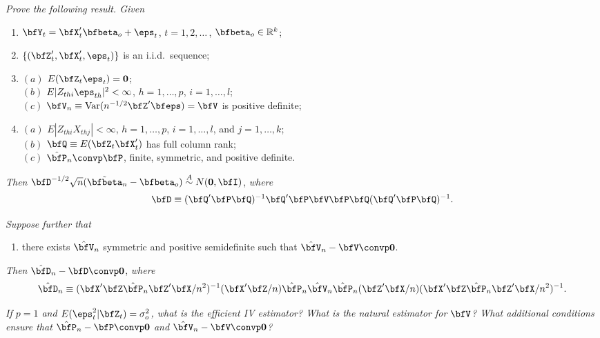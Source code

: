 \begin{exercises}

\item\label{ex:iv-iid-clt} \textit{Prove the following result. Given}
\begin{enumerate}
\item[$(i)$] $\bfY_t = \bfX_t'\bfbeta_o + \eps_t$, \quad $t = 1, 2, \ldots$\,, $\bfbeta_o \in \mathbb{R}^k$;
\item[$(ii)$] $\{(\bfZ_t', \bfX_t', \eps_t)\}$ is an i.i.d.\ sequence;
\item[$(iii)$] $(a)$ $E(\bfZ_t \eps_t) = \mathbf{0}$;\\
$(b)$ $E|Z_{thi}\eps_{th}|^2 < \infty$, $h = 1, \ldots, p$, $i = 1, \ldots, l$;\\
$(c)$ $\bfV_n \equiv \Var(n^{-1/2}\bfZ'\bfeps) = \bfV$ is positive definite;
\item[$(iv)$] $(a)$ $E|Z_{thi}X_{thj}| < \infty$, $h = 1, \ldots, p$, $i = 1, \ldots, l$, and $j = 1, \ldots, k$;\\
$(b)$ $\bfQ \equiv E(\bfZ_t \bfX_t')$ has full column rank;\\
$(c)$ $\hat{\bfP}_n \convp \bfP$, finite, symmetric, and positive definite.
\end{enumerate}

\textit{Then} $\bfD^{-1/2}\sqrt{n}(\tilde{\bfbeta}_n - \bfbeta_o) \overset{A}{\sim} N(\mathbf{0}, \bfI)$, \textit{where}
\[
\bfD \equiv (\bfQ'\bfP\bfQ)^{-1}\bfQ'\bfP\bfV\bfP\bfQ(\bfQ'\bfP\bfQ)^{-1}.
\]

\textit{Suppose further that}

\begin{enumerate}
\item[$(v)$] there exists $\hat{\bfV}_n$ symmetric and positive semidefinite such that $\hat{\bfV}_n - \bfV \convp \mathbf{0}$.
\end{enumerate}

\textit{Then} $\hat{\bfD}_n - \bfD \convp \mathbf{0}$, \textit{where}
\[
\hat{\bfD}_n \equiv (\bfX'\bfZ\hat{\bfP}_n\bfZ'\bfX/n^2)^{-1}(\bfX'\bfZ/n)\hat{\bfP}_n\hat{\bfV}_n\hat{\bfP}_n(\bfZ'\bfX/n)(\bfX'\bfZ\hat{\bfP}_n\bfZ'\bfX/n^2)^{-1}.
\]

\item\label{ex:iv-efficient} \textit{If $p = 1$ and $E(\eps_t^2|\bfZ_t) = \sigma_o^2$, what is the efficient IV estimator? What is the natural estimator for $\bfV$? What additional conditions ensure that $\hat{\bfP}_n - \bfP \convp \mathbf{0}$ and $\hat{\bfV}_n - \bfV \convp \mathbf{0}$?}

\end{exercises}

